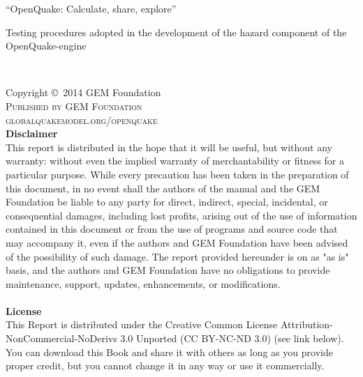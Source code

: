 \documentclass[11pt,fleqn]{book} %
\begin{document}



\begingroup
\thispagestyle{empty}
\par\normalfont\fontsize{15}{15}\sffamily\selectfont
“OpenQuake: Calculate, share, explore”
\centering
\vspace*{9cm}
\par\normalfont\fontsize{35}{35}\sffamily\selectfont
Testing procedures adopted in the development of the hazard 
component of the OpenQuake-engine\par %
\endgroup


\newpage
~\vfill
\thispagestyle{empty}

\noindent Copyright \copyright\ 2014 GEM Foundation\\ %

\noindent \textsc{Published by GEM Foundation}\\ %

\noindent \textsc{globalquakemodel.org/openquake}\\ %

\noindent 
   {\bf{Disclaimer}} \hfill \\
   This report is distributed in 
   the hope that it will be useful, but without any warranty: without 
   even the implied warranty of merchantability or fitness for a 
   particular purpose. While every 
   precaution has been taken in the preparation of this document, in 
   no event shall the authors of the manual and the GEM Foundation be 
   liable to any party for direct, indirect, special, incidental, or 
   consequential damages, including lost profits, arising out of the 
   use of information contained in this document or from the use of 
   programs and source code that may accompany it, even if the authors 
   and GEM Foundation have been advised of the possibility of such damage. 
   The report provided hereunder is on as "as is" basis, and the authors 
   and GEM Foundation have no obligations to provide maintenance, support,
   updates, enhancements, or modifications. 
   \hfill \\
   \vspace{0.4cm} \hfill \\
   {\bf{License}} \hfill \\
   This Report is distributed under the Creative Common License 
   Attribution-NonCommercial-NoDerivs 3.0 Unported (CC BY-NC-ND 3.0) 
   (see link below). You can download this Book and share it with 
   others as long as you provide proper credit, but you cannot change 
   it in any way or use it commercially. 
   \hfill \\
\end{document}
